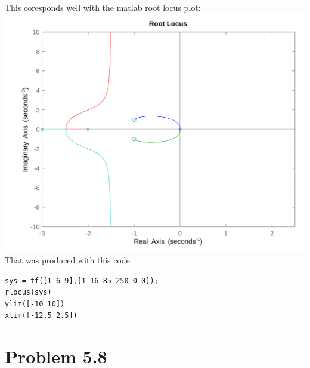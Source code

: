 \documentclass[12pt]{article}
\begin{document}
\\This coresponds well with the matlab root locus plot:\\
\includegraphics[scale=.2]{Problem2Matlab2.png}
\\That was produced with this code
\begin{verbatim}
sys = tf([1 6 9],[1 16 85 250 0 0]);
rlocus(sys)
ylim([-10 10])
xlim([-12.5 2.5])
\end{verbatim}
\section*{Problem 5.8}
\end{document}
